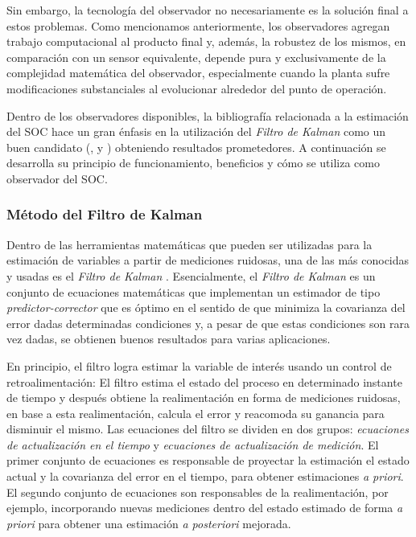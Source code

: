 \noindent Sin embargo, la tecnolog\'ia del observador no necesariamente es la
soluci\'on final a estos problemas. Como mencionamos anteriormente, los
observadores agregan trabajo computacional al producto final y, adem\'as, la
robustez de los mismos, en comparación con un sensor equivalente, depende pura y
exclusivamente de la complejidad matemática del observador, especialmente cuando
la planta sufre modificaciones substanciales al evolucionar alrededor del punto
de operaci\'on. 

\noindent Dentro de los observadores disponibles, la bibliograf\'ia relacionada
a la estimaci\'on del \acrshort{SOC} hace un gran \'enfasis en la utilizaci\'on
del \emph{Filtro de Kalman} como un buen candidato (\cite{spagnol_kalman}, 
\cite{zhihao_kalman} y \cite{atsushi_kalman}) obteniendo resultados
prometedores. A continuaci\'on se desarrolla su principio de funcionamiento, 
beneficios y cómo se utiliza como observador del \acrshort{SOC}.

\subsubsection{M\'etodo del Filtro de Kalman}\label{KalmanFilterMethod}

\noindent Dentro de las herramientas matem\'aticas que pueden ser utilizadas 
para la estimaci\'on de variables a partir de mediciones ruidosas, una de las 
m\'as conocidas y usadas es el \emph{Filtro de Kalman} 
\cite{kalman_filter_paper}. Esencialmente, el \emph{Filtro de Kalman} es un 
conjunto de ecuaciones matem\'aticas que implementan un estimador de tipo 
\emph{predictor-corrector} que es \'optimo en el sentido de que minimiza la 
covarianza del error dadas determinadas condiciones y, a pesar de que estas 
condiciones son rara vez dadas, se obtienen buenos resultados para varias 
aplicaciones.

\noindent En principio, el filtro logra estimar la variable de inter\'es usando 
un control de retroalimentaci\'on: El filtro estima el estado del proceso en 
determinado instante de tiempo y despu\'es obtiene la realimentaci\'on en forma 
de mediciones ruidosas, en base a esta realimentaci\'on, calcula el error y
reacomoda su ganancia para disminuir el mismo. Las ecuaciones del filtro se
dividen en dos grupos: \emph{ecuaciones de actualizaci\'on en el tiempo} 
y \emph{ecuaciones de actualizaci\'on de medici\'on}. El primer conjunto de
ecuaciones es responsable de proyectar la estimaci\'on el estado actual y la
covarianza del error en el tiempo, para obtener estimaciones \emph{a priori}. 
El segundo conjunto de ecuaciones son responsables de la realimentaci\'on, por 
ejemplo, incorporando nuevas mediciones dentro del estado estimado de forma 
\emph{a priori} para obtener una estimaci\'on \emph{a posteriori} mejorada.

